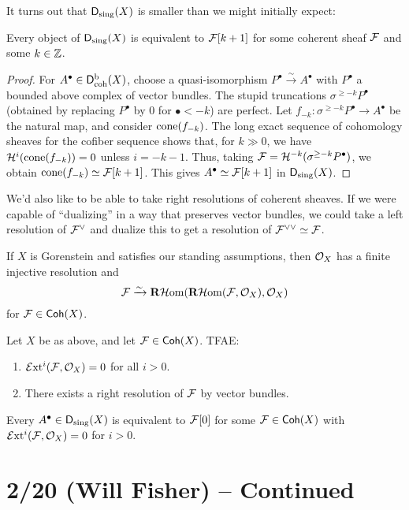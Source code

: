 \documentclass{article}
\begin{document}
It turns out that $\mathsf{D}_{\mathrm{sing}}(X)$ is smaller than we might initially expect:

\begin{prop}
	Every object of $\mathsf{D}_{\mathrm{sing}}(X)$ is equivalent to $\mathcal{F}[k+1]$ for some coherent sheaf $\mathcal{F}$ and some $k \in \mathbb{Z}$.
\end{prop}

\begin{proof}
	For $A^\bullet \in \mathsf{D}^\mathrm{b}_{\mathrm{coh}}(X)$, choose a quasi-isomorphism $P^\bullet \xrightarrow{\sim} A^\bullet$ with $P^\bullet$ a bounded above complex of vector bundles.
	The stupid truncations $\sigma^{\geq -k} P^\bullet$ (obtained by replacing $P^\bullet$ by $0$ for $\bullet < -k$) are perfect.
	Let $f_{-k}: \sigma^{\geq -k} P^\bullet \to A^\bullet$ be the natural map, and consider $\operatorname{cone}(f_{-k})$.
	The long exact sequence of cohomology sheaves for the cofiber sequence shows that, for $k \gg 0$, we have $\mathcal{H}^i(\operatorname{cone}(f_{-k})) = 0$ unless $i = -k-1$.
	Thus, taking $\mathcal{F} = \mathcal{H}^{-k}(\sigma^{\geq -k} P^\bullet)$, we obtain $\operatorname{cone}(f_{-k}) \simeq \mathcal{F}[k+1]$.
	This gives $A^\bullet \simeq \mathcal{F}[k+1]$ in $\mathsf{D}_{\mathrm{sing}}(X)$.
\end{proof}

We'd also like to be able to take right resolutions of coherent sheaves.
If we were capable of ``dualizing'' in a way that preserves vector bundles, we could take a left resolution of $\mathcal{F}^\vee$ and dualize this to get a resolution of $\mathcal{F}^{\vee \vee} \simeq \mathcal{F}$.

If $X$ is Gorenstein and satisfies our standing assumptions, then $\mathcal{O}_X$ has a finite injective resolution and
\[
	\mathcal{F} \xrightarrow{\sim} \mathbf{R}\mathcal{H}\mkern-3mu\operatorname{om}(\mathbf{R}\mathcal{H}\mkern-3mu\operatorname{om}(\mathcal{F}, \mathcal{O}_X), \mathcal{O}_X)
\]
for $\mathcal{F} \in \mathsf{Coh}(X)$.

\begin{lem}
	Let $X$ be as above, and let $\mathcal{F} \in \mathsf{Coh}(X)$.
	TFAE:
	\begin{enumerate}
		\item $\mathcal{E}\mkern-3mu\operatorname{xt}^i(\mathcal{F}, \mathcal{O}_X) = 0$ for all $i > 0$.
		\item There exists a right resolution of $\mathcal{F}$ by vector bundles.
	\end{enumerate}
\end{lem}

\begin{cor}
	Every $A^\bullet \in \mathsf{D}_{\mathrm{sing}}(X)$ is equivalent to $\mathcal{F}[0]$ for some $\mathcal{F} \in \mathsf{Coh}(X)$ with $\mathcal{E}\mkern-3mu\operatorname{xt}^i(\mathcal{F}, \mathcal{O}_X) = 0$ for $i > 0$.
\end{cor}

\section{2/20 (Will Fisher) -- Continued}
\end{document}
